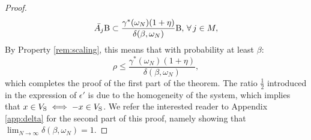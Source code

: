 \begin{proof}
\begin{equation*}
\bar{A_j} \text{B} \subset \frac{\gamma^*(\omega_N)(1+\eta)}{\delta(\beta, \omega_N)}\text{B},\, \forall\, j \in M,
\end{equation*}
By Property \ref{rem:scaling}, this means that with probability at least $\beta$:
$$\rho \leq \frac{\gamma^*(\omega_N) (1 + \eta)}{\delta(\beta, \omega_N)},$$
which completes the proof of the first part of the theorem. The ratio $\frac{1}{2}$ introduced in the expression of $\epsilon'$ is due to the homogeneity of the system, which implies that $x \in V_{\text{S}} \iff -x \in V_{\text{S}}$. We refer the interested reader to Appendix \ref{app:delta} for the second part of this proof, namely showing that $\lim_{N \to \infty}\delta(\beta, \omega_N) = 1$.



%
\end{proof}

